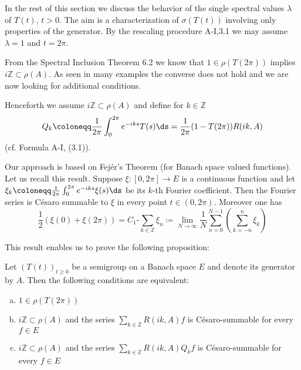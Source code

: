 In the rest of this section we discuss the behavior of the single spectral values $\lambda$ of $T(t)$, $t > 0$.
The aim is a characterization of $\sigma(T(t))$ involving only properties of the generator.
By the rescaling procedure A-I,3.1 we may assume $\lambda = 1$ and $t = 2\pi$.

From the Spectral Inclusion Theorem 6.2 we know that $1 \in \rho(T(2\pi))$ implies $i\mathbb{Z} \subset \rho(A)$.
As seen in many examples the converse does not hold and we are now looking for additional conditions.

Henceforth we assume $i\mathbb{Z} \subset \rho(A)$ and define for $k \in \mathbb{Z}$
\begin{equation}\label{eq:a3-7.7}
Q_{k}\coloneqq \frac{1}{2\pi}\int_{0}^{2\pi} e^{-iks}T(s)\ds = \frac{1}{2\pi}(1 - T(2\pi))R(ik,A)
\end{equation}
(cf. Formula A-I, (3.1)).

Our approach is based on Fejér's Theorem (for Banach space valued functions).
Let us recall this result.
Suppose $\xi \colon [0,2\pi] \to E$ is a continuous function and let $\xi_{k}\coloneqq \frac{1}{2\pi}\int_{0}^{2\pi} e^{-iks}\xi(s)\ds$ be its $k$-th Fourier coefficient.
Then the Fourier series is Césaro summable to $\xi$ in every point $t \in (0,2\pi)$.
Moreover one has
\begin{equation}\label{eq:a3-7.8}
\frac{1}{2}(\xi(0) + \xi(2\pi)) = C_{1}\text{-}\sum_{k\in\mathbb{Z}} \xi_{n} \coloneqq \lim_{N\to\infty} \frac{1}{N}\sum_{n=0}^{N-1}(\sum_{k=-n}^{n} \xi_{k})
\end{equation}

This result enables us to prove the following proposition:


\newpage
\begin{proposition}\label{prop:a3-7.8}
Let $(T(t))_{t\geq 0}$ be a semigroup on a Banach space $E$ and denote its generator by $A$.
Then the following conditions are equivalent:

\begin{enumerate}[(a)]
\item $1 \in \rho(T(2\pi))$

\item $i\mathbb{Z} \subset \rho(A)$ and the series $\sum_{k\in\mathbb{Z}} R(ik,A)f$ is Césaro-summable for every $f \in E$

\item $i\mathbb{Z} \subset \rho(A)$ and the series $\sum_{k\in\mathbb{Z}} R(ik,A)Q_{k}f$ is Césaro-summable for every $f \in E$
\end{enumerate}
\end{proposition}


